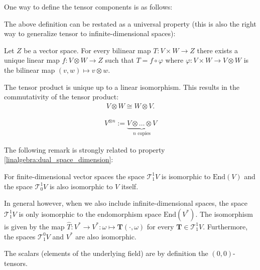     One way to define the tensor components is as follows:

    The above definition can be restated as a universal property (this is also the right way to generalize tensor to infinite-dimensional spaces):
    \begin{uproperty}\label{tensor:prop:universal_property}
        Let $Z$ be a vector space. For every bilinear map $T:V\times W\rightarrow Z$ there exists a unique linear map $f:V\otimes W\rightarrow Z$ such that $T = f\circ\varphi$ where $\varphi:V\times W\rightarrow V\otimes W$ is the bilinear map $(v,w)\mapsto v\otimes w$.
    \end{uproperty}
    \begin{result}
        The tensor product is unique up to a linear isomorphism. This results in the commutativity of the tensor product:
        \begin{gather}
           \label{tensor:commutativity}
            V\otimes W \cong W\otimes V.
        \end{gather}
    \end{result}

    \begin{notation}
        \begin{gather}
            V^{\otimes n} := \underbrace{V\otimes\ldots\otimes V}_{n\text{ copies}}
        \end{gather}
    \end{notation}

    The following remark is strongly related to property \ref{linalgebra:dual_space_dimension}:
    \begin{remark}
        For finite-dimensional vector spaces the space $\mathcal{T}^1_1V$ is isomorphic to $\text{End}(V)$ and the space $\mathcal{T}^1_0V$ is also isomorphic to $V$ itself.

        In general however, when we also include infinite-dimensional spaces, the space $\mathcal{T}^1_1V$ is only isomorphic to the endomorphism space $\text{End}(V^*)$. The isomorphism is given by the map $\hat{T}:V^*\rightarrow V^*:\omega\mapsto\mathbf{T}(\cdot, \omega)$ for every $\mathbf{T}\in\mathcal{T}^1_1V$. Furthermore, the spaces $\mathcal{T}^0_1V$ and $V^*$ are also isomorphic.
    \end{remark}
    \begin{definition}[Scalar]
            The scalars (elements of the underlying field) are by definition the $(0,0)$-tensors.
    \end{definition}

